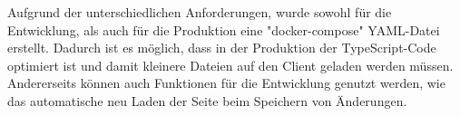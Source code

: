 
Aufgrund der unterschiedlichen Anforderungen, wurde sowohl für die Entwicklung, als auch für die Produktion eine "docker-compose" YAML-Datei erstellt. 
Dadurch ist es möglich, dass in der Produktion der TypeScript-Code optimiert ist und damit kleinere Dateien auf den Client geladen werden müssen. 
Andererseits können auch Funktionen für die Entwicklung genutzt werden, wie das automatische neu Laden der Seite beim Speichern von Änderungen.



